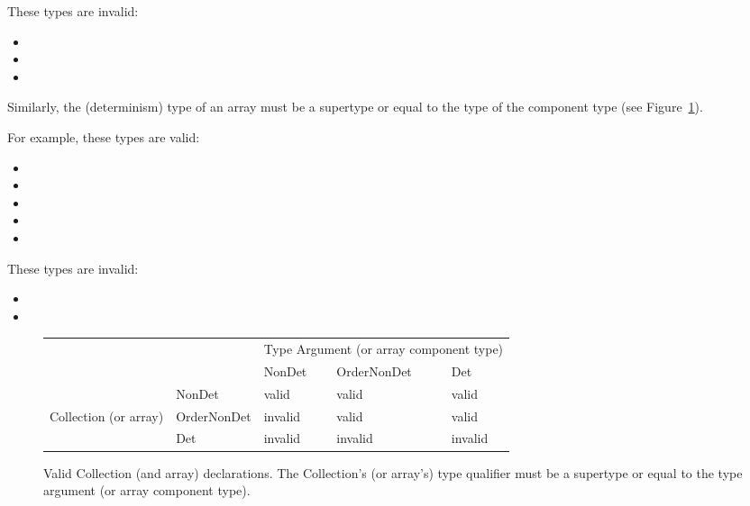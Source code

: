 These types are invalid:
  \begin{itemize}
    \item {}
    \item {}
    \item {}
  \end{itemize}

Similarly, the (determinism) type of an array must be a supertype or equal to
the type of the component type (see Figure~\ref{fig-determinism-collections}).

For example, these types are valid:
\begin{itemize}
    \item {}
    \item {}
    \item {}
    \item {}
    \item {}
\end{itemize}

These types are invalid:
\begin{itemize}
    \item {}
    \item {}
\end{itemize}

\begin{figure}
  \centering
  \begin{tabular}{|l|l|l|l|l|}
    \cline{3-5}
    \multicolumn{2}{c|}{~}  &  \multicolumn{3}{c|}{Type Argument (or array component type)} \\ \cline{3-5}
    \multicolumn{2}{c|}{~}  & NonDet     & OrderNonDet & Det \\ \hline
              & NonDet      &   valid    &  valid      & valid  \\ \cline{2-5}
Collection (or array)   & OrderNonDet &   invalid  &  valid      & valid  \\ \cline{2-5}
              & Det         &   invalid  &  invalid    & invalid      \\ \hline
  \end{tabular}
  \caption{Valid Collection (and array) declarations.  The Collection's (or array's) type qualifier
    must be a supertype or equal to the type argument (or array component type).}
  \label{fig-determinism-collections}
\end{figure}

